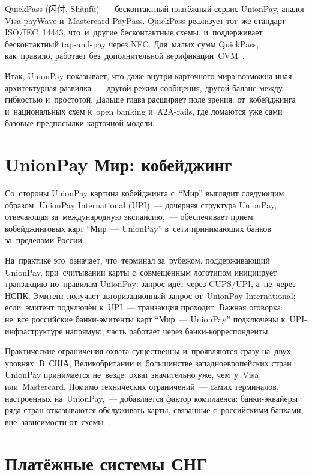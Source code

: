 QuickPass (闪付, Shǎnfù)~--- бесконтактный платёжный сервис UnionPay,
аналог Visa payWave и~Mastercard PayPass. QuickPass реализует тот~же
стандарт ISO/IEC~14443, что~и~другие бесконтактные схемы, и~поддерживает
бесконтактный tap-and-pay через NFC. Для~малых сумм QuickPass, как~правило,
работает без~дополнительной верификации~CVM~.


Итак, UnionPay показывает, что даже внутри карточного мира
возможна иная архитектурная развилка~--- другой режим сообщения,
другой баланс между гибкостью и~простотой. Дальше глава
расширяет поле зрения: от~кобейджинга и~национальных схем
к~open banking и~A2A-rails, где ломаются уже сами базовые
предпосылки карточной модели.

\section{UnionPay \texttimes{} Мир: кобейджинг}
\label{sec:up-mir}

Со~стороны UnionPay картина кобейджинга с~\enquote{Мир} выглядит
следующим образом. UnionPay International (UPI)~--- дочерняя структура
UnionPay, отвечающая за~международную экспансию,~--- обеспечивает
приём кобейджинговых карт \enquote{Мир~--- UnionPay} в~сети
принимающих банков за~пределами России.

На~практике это~означает, что~терминал за~рубежом, поддерживающий
UnionPay, при~считывании карты с~совмещённым логотипом инициирует
транзакцию по~правилам UnionPay: запрос идёт через CUPS/UPI, а~не~через
НСПК. Эмитент получает авторизационный запрос от~UnionPay International;
если~эмитент подключён к~UPI~--- транзакция проходит. Важная оговорка:
не~все российские банки-эмитенты карт \enquote{Мир~--- UnionPay}
подключены к~UPI-инфраструктуре напрямую; часть работает через банки-корреспонденты.

Практические ограничения охвата существенны и~проявляются сразу
на~двух уровнях. В~США, Великобритании и~большинстве западноевропейских
стран UnionPay принимается не~везде: охват значительно уже, чем~у~Visa
или~Mastercard. Помимо технических ограничений~---
самих терминалов, настроенных на~UnionPay,~--- добавляется фактор
комплаенса: банки-эквайеры ряда стран отказываются обслуживать карты,
связанные с~российскими банками, вне~зависимости от~схемы~.


\section{Платёжные системы СНГ}
\label{sec:cis-payment-systems}

